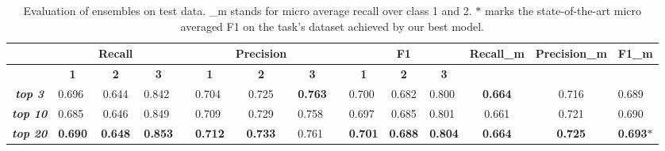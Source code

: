 \documentclass[conference]{IEEEtran}
\begin{document}
\begin{table}[htbp]
\centering
\tabcolsep=0.10cm
\begin{tabular}{clclllclllclccl}
\textbf{} &  & \textbf{Recall} & \textbf{} & \textbf{} &  & \textbf{Precision} & \textbf{} & \textbf{} &  & \textbf{F1} & \textbf{} & \textbf{Recall\_m} & \textbf{Precision\_m} & \textbf{F1\_m} \\ \hline
\multicolumn{1}{|c|}{} & \multicolumn{1}{c|}{\textbf{1}} & \multicolumn{1}{c|}{\textbf{2}} & \multicolumn{1}{c|}{\textbf{3}} & \multicolumn{1}{c|}{} & \multicolumn{1}{c|}{\textbf{1}} & \multicolumn{1}{c|}{\textbf{2}} & \multicolumn{1}{c|}{\textbf{3}} & \multicolumn{1}{c|}{} & \multicolumn{1}{c|}{\textbf{1}} & \multicolumn{1}{c|}{\textbf{2}} & \multicolumn{1}{c|}{\textbf{3}} & \multicolumn{1}{c|}{\textbf{}} & \multicolumn{1}{c|}{\textbf{}} & \multicolumn{1}{c|}{\textbf{}} \\ \hline
\multicolumn{1}{|c|}{\textit{\textbf{top 3}}} & \multicolumn{1}{l|}{0.696} & \multicolumn{1}{c|}{0.644} & \multicolumn{1}{l|}{0.842} & \multicolumn{1}{l|}{} & \multicolumn{1}{l|}{0.704} & \multicolumn{1}{c|}{0.725} & \multicolumn{1}{l|}{\textbf{0.763}} & \multicolumn{1}{l|}{} & \multicolumn{1}{l|}{0.700} & \multicolumn{1}{c|}{0.682} & \multicolumn{1}{l|}{0.800} & \multicolumn{1}{c|}{\textbf{0.664}} & \multicolumn{1}{c|}{0.716} & \multicolumn{1}{l|}{0.689} \\ \hline
\multicolumn{1}{|c|}{\textit{\textbf{top 10}}} & \multicolumn{1}{l|}{0.685} & \multicolumn{1}{c|}{0.646} & \multicolumn{1}{l|}{0.849} & \multicolumn{1}{l|}{} & \multicolumn{1}{l|}{0.709} & \multicolumn{1}{c|}{0.729} & \multicolumn{1}{l|}{0.758} & \multicolumn{1}{l|}{} & \multicolumn{1}{l|}{0.697} & \multicolumn{1}{c|}{0.685} & \multicolumn{1}{l|}{0.801} & \multicolumn{1}{c|}{0.661} & \multicolumn{1}{c|}{0.721} & \multicolumn{1}{l|}{0.690} \\ \hline
\multicolumn{1}{|c|}{\textit{\textbf{top 20}}} & \multicolumn{1}{l|}{\textbf{0.690}} & \multicolumn{1}{c|}{\textbf{0.648}} & \multicolumn{1}{l|}{\textbf{0.853}} & \multicolumn{1}{l|}{} & \multicolumn{1}{l|}{\textbf{0.712}} & \multicolumn{1}{c|}{\textbf{0.733}} & \multicolumn{1}{l|}{0.761} & \multicolumn{1}{l|}{} & \multicolumn{1}{l|}{\textbf{0.701}} & \multicolumn{1}{c|}{\textbf{0.688}} & \multicolumn{1}{l|}{\textbf{0.804}} & \multicolumn{1}{c|}{\textbf{0.664}} & \multicolumn{1}{c|}{\textbf{0.725}} & \multicolumn{1}{l|}{\textbf{0.693$\ast$}} \\ \hline
\end{tabular}
\caption{Evaluation of ensembles on test data. \_m stands for micro average recall over class 1 and 2. $\ast$ marks the state-of-the-art micro averaged F1 on the task's dataset achieved by our best model.}
\label{table_ensemble_results}
\end{table}
\end{document}

